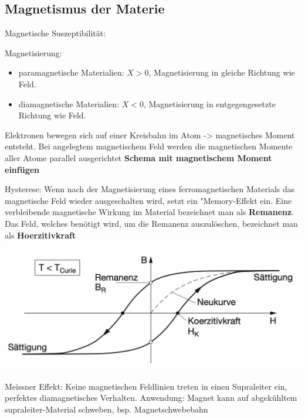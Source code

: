 \subsection{Magnetismus der Materie}
    Magnetische Suszeptibilität:

    Magnetisierung:
    \begin{itemize}
        \item paramagnetische Materialien: $X > 0$, Magnetisierung in gleiche Richtung wie Feld. 
        \item diamagnetische Materialien: $X < 0$, Magnetisierung in entgegengesetzte Richtung wie Feld.
    \end{itemize}

    Elektronen bewegen sich auf einer Kreisbahn im Atom -> magnetisches Moment entsteht. Bei angelegtem magnetischem Feld werden die magnetischen Momente aller Atome parallel ausgerichtet
    \textbf{Schema mit magnetischem Moment einfügen}

    Hysterese: Wenn nach der Magnetisierung eines ferromagnetischen Materials das magnetische Feld wieder ausgeschalten wird, setzt ein "Memory-Effekt ein.
    Eine verbleibende magnetische Wirkung im Material bezeichnet man als \textbf{Remanenz}.
    Das Feld, welches benötigt wird, um die Remanenz auszulöschen, bezeichnet man als \textbf{Hoerzitivkraft}
    \includegraphics[width = \linewidth]{src/images/permanentmagnet.png}

    Meissner Effekt: Keine magnetischen Feldlinien treten in einen Supraleiter ein, perfektes diamagnetisches Verhalten.
    Anwendung: Magnet kann auf abgekühltem supraleiter-Material schweben, bsp. Magnetschwebebahn